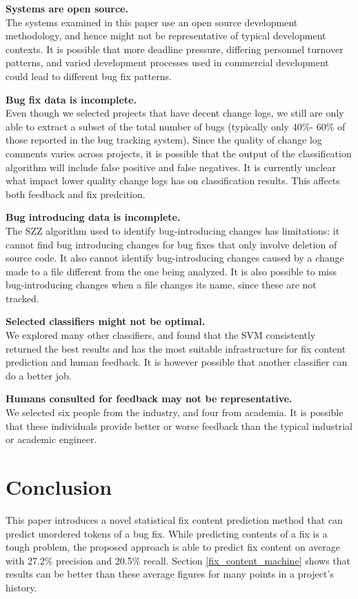\documentclass[10pt, conference, letterpaper, compsocconf]{IEEEtran}
\begin{document}
\par \textbf{Systems are open source.} \\ The systems examined in this paper use an open source
development methodology, and hence might not be representative of typical development contexts. It
is possible that more deadline pressure, differing personnel turnover patterns, and varied
development processes used in commercial development could lead to different bug fix
patterns.

\par \textbf{Bug fix data is incomplete.} \\ Even though we selected projects that have decent change logs,
we still are only able to extract a subset of the total number of bugs (typically only 40\%-
60\% of those reported in the bug tracking system). Since the quality of change log comments varies across
projects, it is possible that the output of the classification algorithm will include false positive
and false negatives. It is currently unclear what impact lower quality change logs has on classification results. This affects both feedback and fix predcition.

\par \textbf{Bug introducing data is incomplete.} \\ The SZZ algorithm used to identify bug-introducing
changes has limitations: it cannot find bug introducing changes for bug fixes that only involve deletion of source code.
It also cannot identify bug-introducing changes caused by a change made to a file different from the one being analyzed. It is also possible to miss bug-introducing
changes when a file changes its name, since these are not tracked.

\par \textbf{Selected classifiers might not be optimal.} \\ We explored many
other classifiers, and found that the SVM consistently returned the
best results and has the most suitable infrastructure for fix content prediction and human feedback. It is however possible that another classifier can do a better job.

\par \textbf{Humans consulted for feedback may not be representative.} \\ We selected six people from the industry, and four from academia. It is possible that these individuals provide better or worse feedback
than the typical industrial or academic engineer.


\section{Conclusion}
\par This paper introduces a novel statistical fix content prediction method that can predict unordered tokens of a bug fix. While predicting contents of a fix is a tough problem, the proposed approach is able to predict fix content
on average with 27.2\% precision and 20.5\% recall. Section \ref{fix_content_machine} shows that results can be better than these average figures for many points in a project's history.
\end{document}
